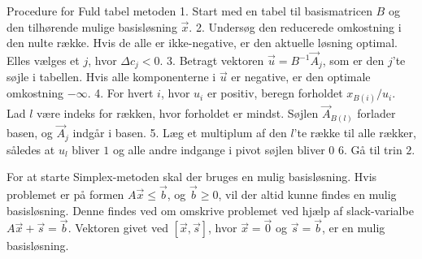 \begin{pro} [label=pro:simplex,numbers=none,xleftmargin=0em] {Procedure for Fuld tabel metoden}
1. Start med en tabel til basismatricen $B$ og den tilhørende mulige basisløsning $\vec{x}$.
2. Undersøg den reducerede omkostning i den nulte række. Hvis de alle er ikke-negative, er den aktuelle løsning optimal. Elles vælges et $j$, hvor $\Delta c_j <0$.
3. Betragt vektoren $\vec{u}=B^{-1}\vec{A}_j$, som er den $j$'te søjle i tabellen. Hvis alle komponenterne i $\vec{u}$ er negative, er den optimale omkostning $-\infty$.
4. For hvert $i$, hvor $u_i$ er positiv, beregn forholdet $x_{B(i)}/u_i$. Lad $l$ være indeks for rækken, hvor forholdet er mindst. Søjlen $\vec{A}_{B(l)}$ forlader basen, og $\vec{A}_j$ indgår i basen. 
5. Læg et multiplum af den $l$'te række til alle rækker, således at $u_l$ bliver $1$ og alle andre indgange i pivot søjlen bliver $0$
6. Gå til trin $2$. 
\end{pro}
For at starte Simplex-metoden skal der bruges en mulig basisløsning. Hvis problemet er på formen $A\vec{x} \leq \vec{b}$, og $\vec{b} \geq 0$, vil der altid kunne findes en mulig basisløsning. Denne findes ved om omskrive problemet ved hjælp af slack-varialbe $A\vec{x} +\vec{s}= \vec{b}$. Vektoren givet ved $[\vec{x},\vec{s}]$, hvor $\vec{x}=\vec{0}$ og $\vec{s}=\vec{b}$, er en mulig basisløsning. 
